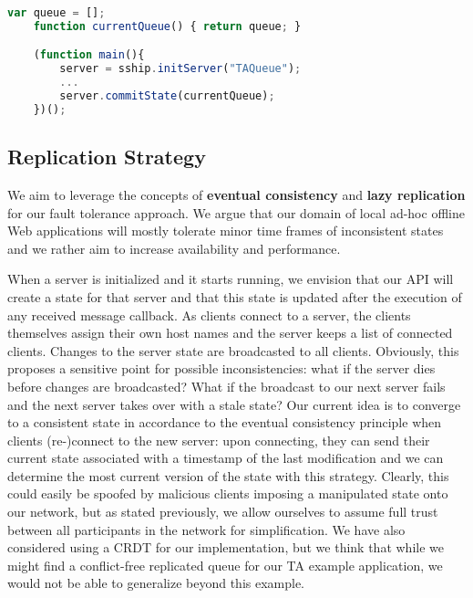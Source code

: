\begin{lstlisting}[language=JavaScript]
    var queue = [];
    function currentQueue() { return queue; }

    (function main(){
        server = sship.initServer("TAQueue");
        ...
        server.commitState(currentQueue);
    })();
\end{lstlisting}

\subsection{Replication Strategy}

We aim to leverage the concepts of \textbf{eventual consistency} and \textbf{lazy replication} for our fault tolerance approach. We argue that our domain of local ad-hoc offline Web applications will mostly tolerate minor time frames of inconsistent states and we rather aim to increase availability and performance.

When a server is initialized and it starts running, we envision that our API will create a state for that server and that this state is updated after the execution of any received message callback. As clients connect to a server, the clients themselves assign their own host names and the server keeps a list of connected clients. Changes to the server state are broadcasted to all clients. Obviously, this proposes a sensitive point for possible inconsistencies: what if the server dies before changes are broadcasted? What if the broadcast to our next server fails and the next server takes over with a stale state? Our current idea is to converge to a consistent state in accordance to the eventual consistency principle when clients (re-)connect to the new server: upon connecting, they can send their current state associated with a timestamp of the last modification and we can determine the most current version of the state with this strategy. Clearly, this could easily be spoofed by malicious clients imposing a manipulated state onto our network, but as stated previously, we allow ourselves to assume full trust between all participants in the network for simplification. We have also considered using a CRDT for our implementation, but we think that while we might find a conflict-free replicated queue for our TA example application, we would not be able to generalize beyond this example.